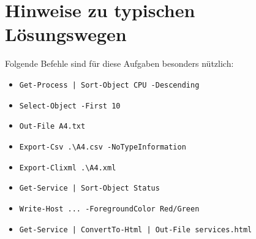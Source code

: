\documentclass[11pt, oneside, numbers=noenddot]{scrbook}
\begin{document}
\section{Hinweise zu typischen Lösungswegen}
Folgende Befehle sind für diese Aufgaben besonders nützlich:
\begin{itemize}
\item \texttt{Get-Process | Sort-Object CPU -Descending}
\item \texttt{Select-Object -First 10}
\item \texttt{Out-File A4.txt}
\item \texttt{Export-Csv .\textbackslash A4.csv -NoTypeInformation}
\item \texttt{Export-Clixml .\textbackslash A4.xml}
\item \texttt{Get-Service | Sort-Object Status}
\item \texttt{Write-Host ... -ForegroundColor Red/Green}
\item \texttt{Get-Service | ConvertTo-Html | Out-File services.html}
\end{itemize}
\end{document}
